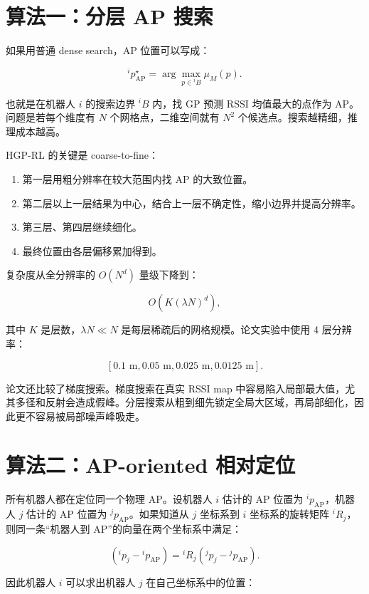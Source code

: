 \documentclass[UTF8,a4paper,12pt]{ctexrep}
\begin{document}
\section{算法一：分层 AP 搜索}

如果用普通 dense search，AP 位置可以写成：

\[
{}^{i}p_{\mathrm{AP}}^\star=\arg\max_{p\in {}^{i}B}\mu_M(p).
\]

也就是在机器人 \(i\) 的搜索边界 \({}^{i}B\) 内，找 GP 预测 RSSI 均值最大的点作为 AP。问题是若每个维度有 \(N\) 个网格点，二维空间就有 \(N^2\) 个候选点。搜索越精细，推理成本越高。

HGP-RL 的关键是 coarse-to-fine：

\begin{enumerate}
  \item 第一层用粗分辨率在较大范围内找 AP 的大致位置。
  \item 第二层以上一层结果为中心，结合上一层不确定性，缩小边界并提高分辨率。
  \item 第三层、第四层继续细化。
  \item 最终位置由各层偏移累加得到。
\end{enumerate}

复杂度从全分辨率的 \(O(N^d)\) 量级下降到：

\[
O(K(\lambda N)^d),
\]

其中 \(K\) 是层数，\(\lambda N \ll N\) 是每层稀疏后的网格规模。论文实验中使用 4 层分辨率：

\[
[0.1\text{ m}, 0.05\text{ m}, 0.025\text{ m}, 0.0125\text{ m}].
\]

论文还比较了梯度搜索。梯度搜索在真实 RSSI map 中容易陷入局部最大值，尤其多径和反射会造成假峰。分层搜索从粗到细先锁定全局大区域，再局部细化，因此更不容易被局部噪声峰吸走。

\section{算法二：AP-oriented 相对定位}

所有机器人都在定位同一个物理 AP。设机器人 \(i\) 估计的 AP 位置为 \({}^{i}p_{\mathrm{AP}}\)，机器人 \(j\) 估计的 AP 位置为 \({}^{j}p_{\mathrm{AP}}\)。如果知道从 \(j\) 坐标系到 \(i\) 坐标系的旋转矩阵 \({}^{i}R_j\)，则同一条“机器人到 AP”的向量在两个坐标系中满足：

\[
({}^{i}p_j-{}^{i}p_{\mathrm{AP}})
=
{}^{i}R_j({}^{j}p_j-{}^{j}p_{\mathrm{AP}}).
\]

因此机器人 \(i\) 可以求出机器人 \(j\) 在自己坐标系中的位置：
\end{document}
